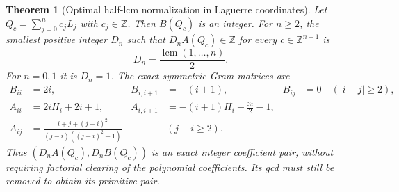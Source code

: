 \documentclass[11pt,a4paper]{article}
\newtheorem{theorem}{Theorem}[section]
\theoremstyle{definition}
\theoremstyle{remark}
\begin{document}
\begin{theorem}[Optimal half-lcm normalization in Laguerre coordinates]
\label{next-square-normalization}
Let $Q_c=\sum_{j=0}^n c_jL_j$ with $c_j\in\mathbb Z$. Then $B(Q_c)$
is an integer. For $n\ge2$, the smallest positive integer $D_n$ such that
$D_nA(Q_c)\in\mathbb Z$ for every $c\in\mathbb Z^{n+1}$ is
\[
 D_n=\frac{\operatorname{lcm}(1,\ldots,n)}2.
\]
For $n=0,1$ it is $D_n=1$. The exact symmetric Gram matrices are
\begin{align}
 B_{ii}&=2i,& B_{i,i+1}&=-(i+1),&
 B_{ij}&=0\quad(|i-j|\ge2),\label{next-square-b-gram}\\
 A_{ii}&=2iH_i+2i+1,\qquad&
 A_{i,i+1}&=-(i+1)H_i-\frac{3i}{2}-1,\label{next-square-a-near}\\
 A_{ij}&=\frac{i+j+(j-i)^2}{(j-i)((j-i)^2-1)}
 &&(j-i\ge2).\label{next-square-a-far}
\end{align}
Thus $(D_nA(Q_c),D_nB(Q_c))$ is an exact integer coefficient pair,
without requiring factorial clearing of the polynomial coefficients.
Its gcd must still be removed to obtain its primitive pair.
\end{theorem}
\end{document}

